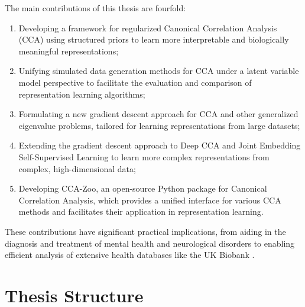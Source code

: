 The main contributions of this thesis are fourfold:
\begin{enumerate}
\item Developing a framework for regularized Canonical Correlation Analysis (CCA) using structured priors to learn more interpretable and biologically meaningful representations;
\item Unifying simulated data generation methods for CCA under a latent variable model perspective to facilitate the evaluation and comparison of representation learning algorithms;
\item Formulating a new gradient descent approach for CCA and other generalized eigenvalue problems, tailored for learning representations from large datasets;
\item Extending the gradient descent approach to Deep CCA and Joint Embedding Self-Supervised Learning to learn more complex representations from complex, high-dimensional data;
\item Developing CCA-Zoo, an open-source Python package for Canonical Correlation Analysis, which provides a unified interface for various CCA methods and facilitates their application in representation learning.
\end{enumerate}
These contributions have significant practical implications, from aiding in the diagnosis and treatment of mental health and neurological disorders to enabling efficient analysis of extensive health databases like the UK Biobank \citep{biobank2014uk}.

\section{Thesis Structure}

